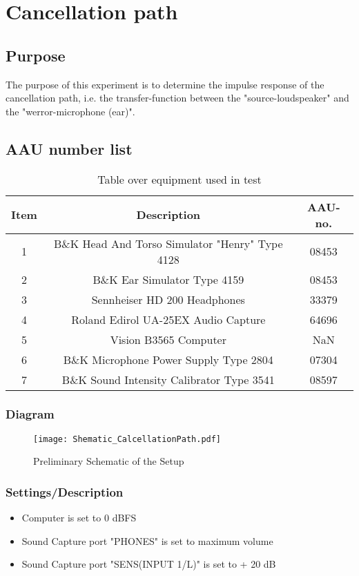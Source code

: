\section{Cancellation path}
\subsection{Purpose}
The purpose of this experiment is to determine the impulse response of the cancellation path, i.e. the transfer-function between the "source-loudspeaker" and the "werror-microphone (ear)".
		
\subsection{AAU number list}
\begin{table}[h]
	\centering
	\begin{tabular}{ c c c } \toprule
		{Item}	& {Description} 						& {AAU-no}. \\ \bottomrule 
		1	&	B\&K Head And Torso Simulator "Henry" Type 4128	& 08453		\\
		2	&	B\&K Ear Simulator Type 4159			& 08453		\\
		3	&	Sennheiser HD 200	Headphones			& 33379		\\
		4	&	Roland Edirol UA-25EX Audio Capture		& 64696		\\
		5	&	Vision B3565 Computer					& NaN		\\
		6	&	B\&K Microphone Power Supply Type 2804	& 07304		\\
		7	&	B\&K Sound Intensity Calibrator Type 3541	& 08597	\\ \bottomrule
	\end{tabular}
	\caption{Table over equipment used in test}
	\label{tab:UsedEquipmentListning1}
\end{table}

\subsubsection{Diagram}
\begin{figure}[H]
	\centering
	\texttt{[image: Shematic\_CalcellationPath.pdf]}
	\caption{Preliminary Schematic of the Setup}
	\label{Schematic}
\end{figure}
\subsubsection{Settings/Description}
\label{SettingsCacellationPath}
\begin{itemize}
	\item Computer is set to 0 dBFS
	\item Sound Capture port "PHONES" is set to maximum volume
	\item Sound Capture port "SENS(INPUT 1/L)" is set to + 20 dB
\end{itemize}


